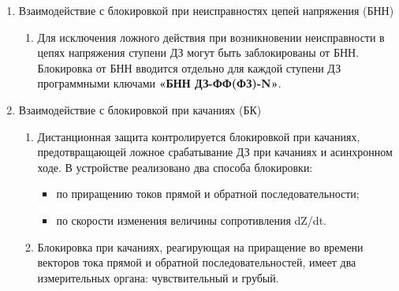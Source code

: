 \begin{enumerate}
\begin{enumerate}
\medskip

\item
Уставки ступеней ДЗ от однофазных КЗ (ДЗ-ФЗ-4, ДЗ-ФЗ-5) представлены в таблице \ref{app_set:dz}.


\end{enumerate}


\item\label{sec:secbnn} Взаимодействие с блокировкой при неисправностях цепей напряжения (БНН)
\begin{enumerate}

\item
Для исключения ложного действия при возникновении неисправности в цепях напряжения ступени ДЗ могут быть заблокированы от БНН. Блокировка от БНН вводится отдельно для каждой ступени ДЗ программными ключами \textbf{«БНН ДЗ-ФФ(ФЗ)-N»}.

\end{enumerate}


\item\label{sec:secbk} Взаимодействие с блокировкой при качаниях (БК)
\begin{enumerate}

\item
Дистанционная защита контролируется блокировкой при качаниях, предотвращающей ложное срабатывание ДЗ при качаниях и асинхронном ходе. В устройстве реализовано два способа блокировки:
\begin{itemize}
  \item по приращению токов прямой и обратной последовательности;
  \item по скорости изменения величины сопротивления dZ/dt.
\end{itemize}

\item
Блокировка при качаниях, реагирующая на приращение во времени векторов тока прямой и обратной последовательностей, имеет два измерительных органа: чувствительный и грубый.


\end{enumerate}
\end{enumerate}
